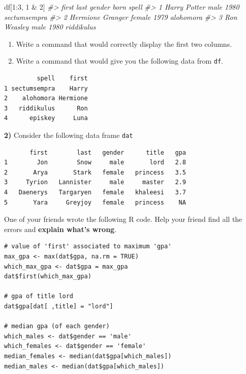 \documentclass[
]{book}
\newenvironment{Shaded}{\begin{snugshade}}{\end{snugshade}}
\newcommand{\CommentTok}[1]{\textcolor[rgb]{0.56,0.35,0.01}{\textit{#1}}}
\newcommand{\DecValTok}[1]{\textcolor[rgb]{0.00,0.00,0.81}{#1}}
\newcommand{\NormalTok}[1]{#1}
\newcommand{\SpecialCharTok}[1]{\textcolor[rgb]{0.00,0.00,0.00}{#1}}
\begin{document}
\begin{Shaded}
\begin{Highlighting}[]
\NormalTok{df[}\DecValTok{1}\SpecialCharTok{:}\DecValTok{3}\NormalTok{, }\DecValTok{1} \SpecialCharTok{\&} \DecValTok{2}\NormalTok{]}
\CommentTok{\#\textgreater{}      first    last gender born        spell}
\CommentTok{\#\textgreater{} 1    Harry  Potter   male 1980 sectumsempra}
\CommentTok{\#\textgreater{} 2 Hermione Granger female 1979    alohomora}
\CommentTok{\#\textgreater{} 3      Ron Weasley   male 1980   riddikulus}
\end{Highlighting}
\end{Shaded}

\begin{enumerate}
\def\labelenumi{\alph{enumi})}
\setcounter{enumi}{3}
\item
  Write a command that would correctly display the first two columns.
\item
  Write a command that would give you the following data from \texttt{df}.
\end{enumerate}

\begin{verbatim}
         spell    first
1 sectumsempra    Harry
2    alohomora Hermione
3   riddikulus      Ron
4      episkey     Luna
\end{verbatim}

\textbf{2)} Consider the following data frame \texttt{dat}

\begin{verbatim}
       first        last   gender      title   gpa
1        Jon        Snow     male       lord   2.8
2       Arya       Stark   female   princess   3.5
3     Tyrion   Lannister     male     master   2.9
4   Daenerys   Targaryen   female   khaleesi   3.7
5       Yara     Greyjoy   female   princess    NA
\end{verbatim}

One of your friends wrote the following R code. Help your friend find all the
errors and \textbf{explain what's wrong}.

\begin{verbatim}
# value of 'first' associated to maximum 'gpa'
max_gpa <- max(dat$gpa, na.rm = TRUE)
which_max_gpa <- dat$gpa = max_gpa
dat$first(which_max_gpa)

# gpa of title lord
dat$gpa[dat[ ,title] = "lord"]

# median gpa (of each gender)
which_males <- dat$gender == 'male'
which_females <- dat$gender == 'female'
median_females <- median(dat$gpa[which_males])
median_males <- median(dat$gpa[which_males])
\end{verbatim}
\end{document}
